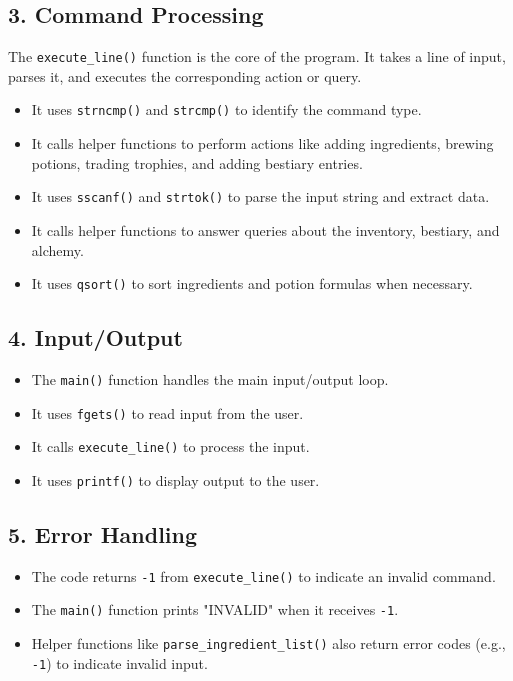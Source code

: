 \documentclass[12pt,a4paper]{article}
\begin{document}
\subsection*{3. Command Processing}
The \texttt{execute\_line()} function is the core of the program. It takes a line of input, parses it, and executes the corresponding action or query.
\begin{itemize}
  \item It uses \texttt{strncmp()} and \texttt{strcmp()} to identify the command type.
  \item It calls helper functions to perform actions like adding ingredients, brewing potions, trading trophies, and adding bestiary entries.
  \item It uses \texttt{sscanf()} and \texttt{strtok()} to parse the input string and extract data.
  \item It calls helper functions to answer queries about the inventory, bestiary, and alchemy.
  \item It uses \texttt{qsort()} to sort ingredients and potion formulas when necessary.
\end{itemize}

\subsection*{4. Input/Output}
\begin{itemize}
  \item The \texttt{main()} function handles the main input/output loop.
  \item It uses \texttt{fgets()} to read input from the user.
  \item It calls \texttt{execute\_line()} to process the input.
  \item It uses \texttt{printf()} to display output to the user.
\end{itemize}

\subsection*{5. Error Handling}
\begin{itemize}
  \item The code returns \texttt{-1} from \texttt{execute\_line()} to indicate an invalid command.
  \item The \texttt{main()} function prints "INVALID" when it receives \texttt{-1}.
  \item Helper functions like \texttt{parse\_ingredient\_list()} also return error codes (e.g., \texttt{-1}) to indicate invalid input.
\end{itemize}
\end{document}
